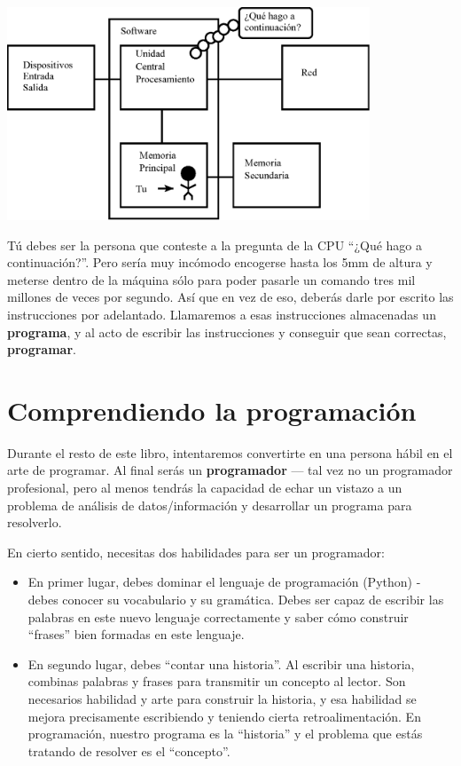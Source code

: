 \beforefig
\centerline{\includegraphics[height=2.50in]{figs2/arch2.eps}}
\afterfig

Tú debes ser la persona que conteste a la pregunta de la CPU ``¿Qué hago a continuación?''.
Pero sería muy incómodo encogerse hasta los 5mm de altura
y meterse dentro de la máquina sólo para poder pasarle un comando
tres mil millones de veces por segundo. Así que en vez de eso,
deberás darle por escrito las instrucciones por adelantado.
Llamaremos a esas instrucciones almacenadas un {\bf programa}, y al acto
de escribir las instrucciones y conseguir que
sean correctas, {\bf programar}.

\section{Comprendiendo la programación}

Durante el resto de este libro, intentaremos convertirte en una persona
hábil en el arte de programar. Al final serás un
{\bf programador} --- tal vez no un programador profesional, pero
al menos tendrás la capacidad de echar un vistazo a un problema de análisis
de datos/información y desarrollar un programa para resolverlo.


En cierto sentido, necesitas dos habilidades para ser un programador:

\begin{itemize}

\item En primer lugar, debes dominar el lenguaje de programación (Python) -
debes conocer su vocabulario y su gramática. Debes ser capaz de escribir
las palabras en este nuevo lenguaje correctamente y saber cómo construir
``frases'' bien formadas en este lenguaje.

\item En segundo lugar, debes ``contar una historia''. Al escribir una historia,
combinas palabras y frases para transmitir un concepto al lector.
Son necesarios habilidad y arte para construir la historia, y esa habilidad
se mejora precisamente escribiendo y teniendo cierta retroalimentación.
En programación, nuestro programa es la ``historia'' y el problema
que estás tratando de resolver es el ``concepto''.

\end{itemize}

